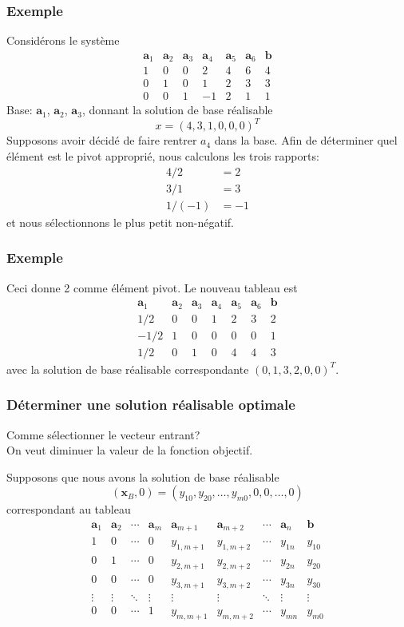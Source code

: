 \documentclass[t,usepdftitle=false]{beamer}
\def\ba{\boldsymbol{a}}
\def\bb{\boldsymbol{b}}
\def\bx{\boldsymbol{x}}
\begin{document}
\begin{frame}
\frametitle{Exemple}

Considérons le système
\[
\begin{matrix}
\ba_1 & \ba_2 & \ba_3 & \ba_4 & \ba_5 & \ba_6 & \bb \\
1 & 0 & 0 & 2 & 4 & 6 & 4 \\
0 & 1 & 0 & 1 & 2 & 3 & 3 \\
0 & 0 & 1 & -1 & 2 & 1 & 1
\end{matrix}
\]
Base: $\ba_1$, $\ba_2$, $\ba_3$, donnant la solution de base réalisable
\[
x = (4, 3, 1, 0, 0, 0)^T
\]
Supposons avoir décidé de faire rentrer $a_4$ dans la base.
Afin de déterminer quel élément est le pivot approprié, nous calculons les trois rapports:
\begin{align*}
4/2 &= 2 \\
3/1 &= 3 \\
1/(-1) &= -1
\end{align*}
et nous sélectionnons le plus petit non-négatif.

\end{frame}

\begin{frame}
\frametitle{Exemple}

Ceci donne 2 comme élément pivot. Le nouveau tableau est
\[
\begin{matrix}
\ba_1 & \ba_2 & \ba_3 & \ba_4 & \ba_5 & \ba_6 & \bb \\
1/2 & 0 & 0 & 1 & 2 & 3 & 2 \\
-1/2 & 1 & 0 & 0 & 0 & 0 & 1 \\
1/2 & 0 & 1 & 0 & 4 & 4 & 3
\end{matrix}
\]
avec la solution de base réalisable correspondante
$(0, 1, 3, 2, 0, 0)^T$.

\end{frame}

\begin{frame}
\frametitle{Déterminer une solution réalisable optimale}

Comme sélectionner le vecteur entrant?\\
On veut diminuer la valeur de la fonction objectif.

\mbox{}

Supposons que nous avons la solution de base réalisable
\[
(\bx_B, 0) = (y_{10}, y_{20},\ldots,y_{m0},0,0,\ldots,0)
\]
correspondant au tableau
\[
\begin{matrix}
\ba_1 & \ba_2 & \cdots & \ba_m & \ba_{m+1} &
\ba_{m+2} & \cdots & \ba_n & \bb \\
1 & 0 & \cdots & 0 & y_{1,m+1} & y_{1,m+2} & \cdots & y_{1n} & y_{10} \\
0 & 1 & \cdots & 0 & y_{2,m+1} & y_{2,m+2} & \cdots & y_{2n} & y_{20} \\
0 & 0 & \cdots & 0 & y_{3,m+1} & y_{3,m+2} & \cdots & y_{3n} & y_{30} \\
\vdots & \vdots & \ddots & \vdots & \vdots & \vdots & \ddots & \vdots & \vdots \\
0 & 0 & \cdots & 1 & y_{m,m+1} & y_{m,m+2} & \cdots & y_{mn} & y_{m0}
\end{matrix}
\]
\end{frame}
\end{document}
